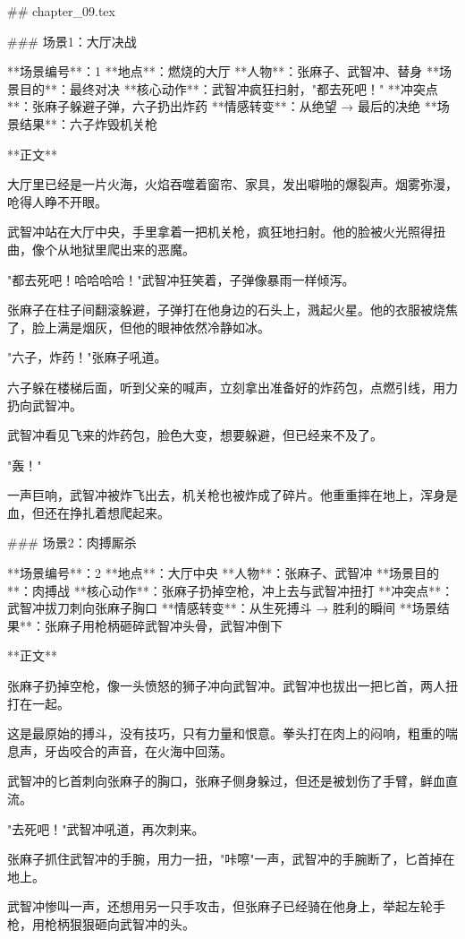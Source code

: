## chapter_09.tex

### 场景1：大厅决战

**场景编号**：1  
**地点**：燃烧的大厅  
**人物**：张麻子、武智冲、替身  
**场景目的**：最终对决  
**核心动作**：武智冲疯狂扫射，"都去死吧！"  
**冲突点**：张麻子躲避子弹，六子扔出炸药  
**情感转变**：从绝望 → 最后的决绝  
**场景结果**：六子炸毁机关枪

**正文**

大厅里已经是一片火海，火焰吞噬着窗帘、家具，发出噼啪的爆裂声。烟雾弥漫，呛得人睁不开眼。

武智冲站在大厅中央，手里拿着一把机关枪，疯狂地扫射。他的脸被火光照得扭曲，像个从地狱里爬出来的恶魔。

"都去死吧！哈哈哈哈！"武智冲狂笑着，子弹像暴雨一样倾泻。

张麻子在柱子间翻滚躲避，子弹打在他身边的石头上，溅起火星。他的衣服被烧焦了，脸上满是烟灰，但他的眼神依然冷静如冰。

"六子，炸药！"张麻子吼道。

六子躲在楼梯后面，听到父亲的喊声，立刻拿出准备好的炸药包，点燃引线，用力扔向武智冲。

武智冲看见飞来的炸药包，脸色大变，想要躲避，但已经来不及了。

"轰！"

一声巨响，武智冲被炸飞出去，机关枪也被炸成了碎片。他重重摔在地上，浑身是血，但还在挣扎着想爬起来。

### 场景2：肉搏厮杀

**场景编号**：2  
**地点**：大厅中央  
**人物**：张麻子、武智冲  
**场景目的**：肉搏战  
**核心动作**：张麻子扔掉空枪，冲上去与武智冲扭打  
**冲突点**：武智冲拔刀刺向张麻子胸口  
**情感转变**：从生死搏斗 → 胜利的瞬间  
**场景结果**：张麻子用枪柄砸碎武智冲头骨，武智冲倒下

**正文**

张麻子扔掉空枪，像一头愤怒的狮子冲向武智冲。武智冲也拔出一把匕首，两人扭打在一起。

这是最原始的搏斗，没有技巧，只有力量和恨意。拳头打在肉上的闷响，粗重的喘息声，牙齿咬合的声音，在火海中回荡。

武智冲的匕首刺向张麻子的胸口，张麻子侧身躲过，但还是被划伤了手臂，鲜血直流。

"去死吧！"武智冲吼道，再次刺来。

张麻子抓住武智冲的手腕，用力一扭，"咔嚓"一声，武智冲的手腕断了，匕首掉在地上。

武智冲惨叫一声，还想用另一只手攻击，但张麻子已经骑在他身上，举起左轮手枪，用枪柄狠狠砸向武智冲的头。

